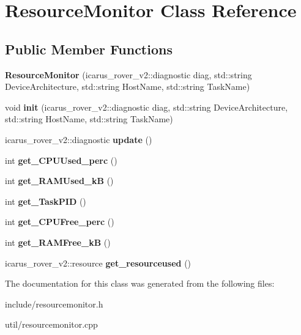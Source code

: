 \hypertarget{classResourceMonitor}{}\section{Resource\+Monitor Class Reference}
\label{classResourceMonitor}
\subsection*{Public Member Functions}
\begin{DoxyCompactItemize}
\item 
\mbox{\label{classResourceMonitor_a5638d0e7b87b21a666caddc1cc7b0cf1}} 
{\bfseries Resource\+Monitor} (icarus\+\_\+rover\+\_\+v2\+::diagnostic diag, std\+::string Device\+Architecture, std\+::string Host\+Name, std\+::string Task\+Name)
\item 
\mbox{\label{classResourceMonitor_a1dc65b926663b51ea533a65e653ae5bb}} 
void {\bfseries init} (icarus\+\_\+rover\+\_\+v2\+::diagnostic diag, std\+::string Device\+Architecture, std\+::string Host\+Name, std\+::string Task\+Name)
\item 
\mbox{\label{classResourceMonitor_a267884d8e55e60e910cda92f38f25e46}} 
icarus\+\_\+rover\+\_\+v2\+::diagnostic {\bfseries update} ()
\item 
\mbox{\label{classResourceMonitor_a6ad7e9c3d016bbda15870abb2d872cc8}} 
int {\bfseries get\+\_\+\+C\+P\+U\+Used\+\_\+perc} ()
\item 
\mbox{\label{classResourceMonitor_a6659690972dab2bcf748fd36be5a815b}} 
int {\bfseries get\+\_\+\+R\+A\+M\+Used\+\_\+kB} ()
\item 
\mbox{\label{classResourceMonitor_a6be004de1a8f1b12f39dfcf12730cc75}} 
int {\bfseries get\+\_\+\+Task\+P\+ID} ()
\item 
\mbox{\label{classResourceMonitor_af032b39376c10781faf5a7809c6da1ba}} 
int {\bfseries get\+\_\+\+C\+P\+U\+Free\+\_\+perc} ()
\item 
\mbox{\label{classResourceMonitor_a408c59c035c26c8d36318b4140f01c8e}} 
int {\bfseries get\+\_\+\+R\+A\+M\+Free\+\_\+kB} ()
\item 
\mbox{\label{classResourceMonitor_a25af7a2d07b351dc76a78ea38a1cec06}} 
icarus\+\_\+rover\+\_\+v2\+::resource {\bfseries get\+\_\+resourceused} ()
\end{DoxyCompactItemize}


The documentation for this class was generated from the following files\+:\begin{DoxyCompactItemize}
\item 
include/resourcemonitor.\+h\item 
util/resourcemonitor.\+cpp\end{DoxyCompactItemize}
